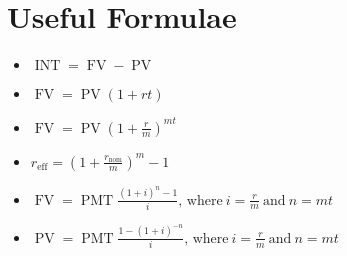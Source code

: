 \documentclass[12pt]{amsart}
\begin{document}
\section{Useful Formulae}

\begin{itemize}
  \newcommand{\INT}{\operatorname{INT}}
  \newcommand{\PV}{\operatorname{PV}}
  \newcommand{\FV}{\operatorname{FV}}
  \newcommand{\PMT}{\operatorname{PMT}}
\item
  $\INT = \FV - \PV$
\item
  $\FV = \PV(1 + rt)$
\item
  $\FV = \PV \left(1 + \frac{r}{m}\right)^{mt}$
\item
  $r_\text{eff} = \displaystyle{\left( 1 + \frac{r_\text{nom}}{m}\right)^m - 1}$
\item
  $\FV = \PMT \displaystyle{\frac{(1 + i)^n - 1}{i}},\, \text{where}\ i = \frac{r}{m}\ \text{and}\ n = mt$
\item
  $\PV = \PMT \displaystyle{\frac{1 - (1 + i)^{-n}}{i}},\, \text{where}\ i = \frac{r}{m}\ \text{and}\ n = mt$
\end{itemize}
\end{document}
